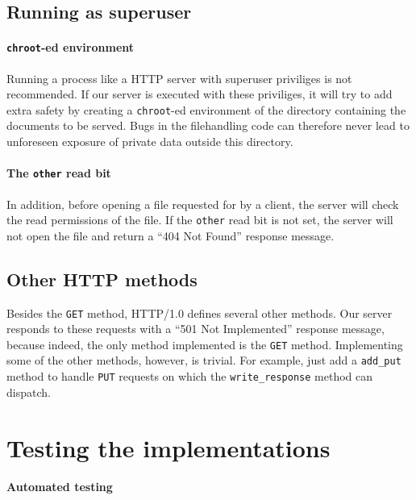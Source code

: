 \documentclass[11pt]{article}
\begin{document}
\subsection{Running as superuser}

\paragraph{\lstinline|chroot|-ed environment}

Running a process like a HTTP server with superuser priviliges is not
recommended. If our server is executed with these priviliges, it will try to
add extra safety by creating a \lstinline|chroot|-ed environment of the
directory containing the documents to be served. Bugs in the filehandling code
can therefore never lead to unforeseen exposure of private data outside this
directory.

\paragraph{The \lstinline|other| read bit}

In addition, before opening a file requested for by a client, the server will
check the read permissions of the file. If the \lstinline|other| read bit is
not set, the server will not open the file and return a ``404 Not Found''
response message.


\subsection{Other HTTP methods}

Besides the \lstinline|GET| method, HTTP/1.0 defines several other
methods. Our server responds to these requests with a ``501 Not Implemented''
response message, because indeed, the only method implemented is the
\lstinline|GET| method. Implementing some of the other methods, however, is
trivial. For example, just add a \lstinline|add_put| method to handle
\lstinline|PUT| requests on which the \lstinline|write_response| method can
dispatch.


\section{Testing the implementations}

\paragraph{Automated testing}
\end{document}
